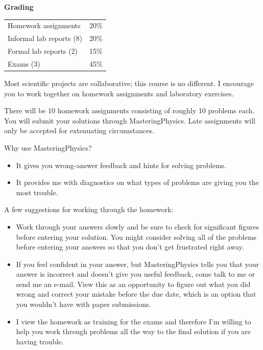 \documentclass[11pt,letterpaper]{article}
\newcommand{\squeezeup}{\vspace{-2.5mm}}
\begin{document}
\clearpage
\textbf{Grading} 
\begin{table}[h!]
\squeezeup
\begin{tabular}{ll}
Homework assignments & 20\%\\
Informal lab reports (8) & 20\%\\
Formal lab reports (2) & 15\%\\
Exams (3) & 45\%
\end{tabular}
\end{table}

Most scientific projects are collaborative; this course is no different. I encourage you to work together on homework assignments and laboratory exercises. %

There will be 10 homework assignments consisting of roughly 10 problems each. You will submit your solutions through MasteringPhysics. Late assignments will only be accepted for extenuating circumstances.

Why use MasteringPhysics?
\begin{itemize}\itemsep -5pt
\item It gives you wrong-answer feedback and hints for solving problems.
\item It provides me with diagnostics on what types of problems are giving you the most trouble.
\end{itemize}

A few suggestions for working through the homework:
\begin{itemize}\itemsep -5pt
\item Work through your answers slowly and be sure to check for significant figures before entering your solution. You might consider solving all of the problems before entering your answers so that you don't get frustrated right away.
\item If you feel confident in your answer, but MasteringPhysics tells you that your answer is incorrect and doesn't give you useful feedback, come talk to me or send me an e-mail. View this as an opportunity to figure out what you did wrong and correct your mistake before the due date, which is an option that you wouldn't have with paper submissions.
\item I view the homework as training for the exams and therefore I'm willing to help you work through problems all the way to the final solution if you are having trouble. 
\end{itemize}
\end{document}
